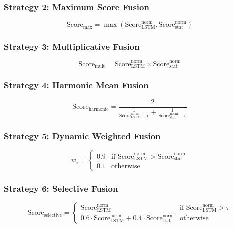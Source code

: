 \documentclass[conference]{IEEEtran}
\begin{document}
\subsubsection{Strategy 2: Maximum Score Fusion}
\begin{equation}
\text{Score}_{\text{max}} = \max(\text{Score}_{\text{LSTM}}^{\text{norm}}, \text{Score}_{\text{stat}}^{\text{norm}})
\label{eq:maximum}
\end{equation}

\subsubsection{Strategy 3: Multiplicative Fusion}
\begin{equation}
\text{Score}_{\text{mult}} = \text{Score}_{\text{LSTM}}^{\text{norm}} \times \text{Score}_{\text{stat}}^{\text{norm}}
\label{eq:multiplicative}
\end{equation}

\subsubsection{Strategy 4: Harmonic Mean Fusion}
\begin{equation}
\text{Score}_{\text{harmonic}} = \frac{2}{\frac{1}{\text{Score}_{\text{LSTM}}^{\text{norm}} + \epsilon} + \frac{1}{\text{Score}_{\text{stat}}^{\text{norm}} + \epsilon}}
\label{eq:harmonic}
\end{equation}

\subsubsection{Strategy 5: Dynamic Weighted Fusion}
\begin{equation}
w_i = \begin{cases} 
0.9 & \text{if } \text{Score}_{\text{LSTM}}^{\text{norm}} > \text{Score}_{\text{stat}}^{\text{norm}} \\
0.1 & \text{otherwise}
\end{cases}
\label{eq:dynamic_weight}
\end{equation}

\subsubsection{Strategy 6: Selective Fusion}
\begin{equation}
\text{Score}_{\text{selective}} = \begin{cases}
\text{Score}_{\text{LSTM}}^{\text{norm}} & \text{if } \text{Score}_{\text{LSTM}}^{\text{norm}} > \tau \\
0.6 \cdot \text{Score}_{\text{LSTM}}^{\text{norm}} + 0.4 \cdot \text{Score}_{\text{stat}}^{\text{norm}} & \text{otherwise}
\end{cases}
\label{eq:selective}
\end{equation}
\end{document}
